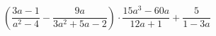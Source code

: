 \begin{ex}[type=expression]
	\begin{condition}
		\( \left( \dfrac{3a-1}{a^2-4}-\dfrac{9a}{3a^2+5a-2} \right)\cdot\dfrac{15a^3-60a}{12a+1}+\dfrac{5}{1-3a} \)
	\end{condition}
\end{ex}